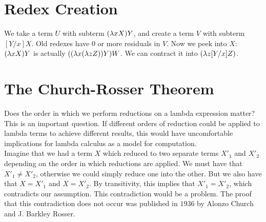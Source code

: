 \section{Redex Creation}
We take a term $U$ with subterm $(\lambda xX)Y$, and create a term $V$ with subterm $[Y/x]X$. Old redexes have 0 or more residuals in $V$. Now we peek into $X$: $(\lambda xX)Y$ is actually $((\lambda x(\lambda zZ))Y)W$. We can contract it into $(\lambda z[Y/x]Z)$.

\section{The Church-Rosser Theorem}
Does the order in which we perform reductions on a lambda expression matter? This is an important question. If different orders of reduction could be applied to lambda terms to achieve different results, this would have uncomfortable implications for lambda calculus as a model for computation.\\

Imagine that we had a term $X$ which reduced to two separate terms $X'_1$ and $X'_2$ depending on the order in which reductions are applied. We must have that $X'_1 \not= X'_2$, otherwise we could simply reduce one into the other. But we also have that $X = X'_1$ and $X = X'_2$. By transitivity, this implies that $X'_1 = X'_2$, which contradicts our assumption. This contradiction would be a problem. The proof that this contradiction does not occur was published in $1936$ by Alonzo Church and J. Barkley Rosser.\\


